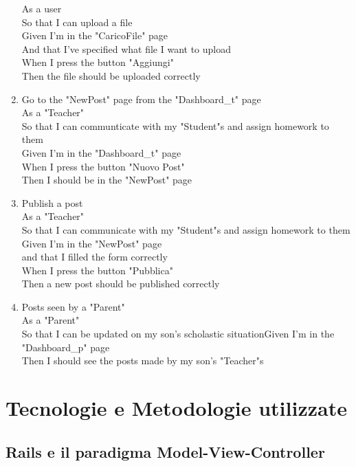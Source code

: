 \documentclass[Lau, binding=0.6cm]{sapthesis}
\begin{document}
\begin{enumerate}
			As a user\\
			So that I can upload a file\\
			Given I’m in the "CaricoFile" page\\
			And that I’ve specified what file I want to upload\\
			When I press the button "Aggiungi"\\
			Then the file should be uploaded correctly\\
	\item Go to the "NewPost" page from the "Dashboard\_t" page\\
			As a "Teacher"\\
			So that I can communticate with my "Student"s and assign homework to them\\
			Given I’m in the "Dashboard\_t" page\\
			When I press the button "Nuovo Post"\\
			Then I should be in the "NewPost" page\\
	\item Publish a post\\
			As a "Teacher"\\
			So that I can communicate with my "Student"s and assign homework to them\\
			Given I’m in the "NewPost" page\\
			and that I filled the form correctly\\
			When I press the button "Pubblica"\\
			Then a new post should be published correctly\\
	\item Posts seen by a "Parent"\\
			As a "Parent"\\
			So that I can be updated on my son’s scholastic situationGiven I’m in the "Dashboard\_p" page\\
			Then I should see the posts made by my son’s "Teacher"s\\
\end{enumerate}

\chapter{Tecnologie e Metodologie utilizzate}

\section{Rails e il paradigma Model-View-Controller}
\end{document}
